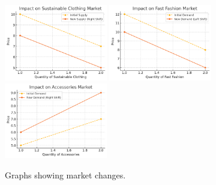 \documentclass{article}
\begin{document}
\begin{figure}[h]
    \centering
    \includegraphics[width=0.4\textwidth]{Photos/ImpactOnSustainableClothingMarket.png}
    \includegraphics[width=0.4\textwidth]{Photos/ImpactOnFastFashionMarket.png}
    \includegraphics[width=0.4\textwidth]{Photos/ImpactOnAccessoriesMarket.png}
    \caption{Graphs showing market changes.}
\end{figure}
\end{document}

